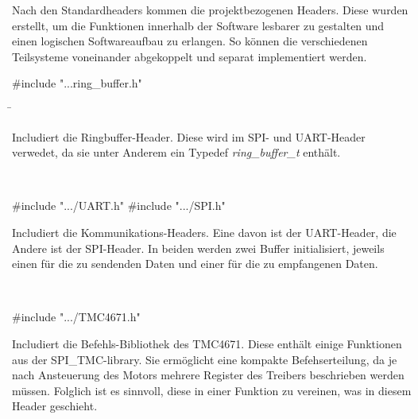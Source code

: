 Nach den Standardheaders kommen die projektbezogenen Headers. Diese wurden erstellt, um die Funktionen innerhalb der Software lesbarer zu gestalten und einen logischen Softwareaufbau zu erlangen. So können die verschiedenen Teilsysteme voneinander abgekoppelt und separat implementiert werden.

\begin{tabbing}
\parbox[t]{.3\textwidth}{

\#include "...ring\_buffer.h"

} \=\parbox[t]{.7\textwidth}{

Includiert die Ringbuffer-Header. Diese wird im SPI- und UART-Header verwedet, da sie unter Anderem ein Typedef \textit{ring\_buffer\_t} enthält.%
\\

}\\

\parbox[t]{.3\textwidth}{

\#include ".../UART.h" \newline \#include ".../SPI.h"

} \>\parbox[t]{.7\textwidth}{

Includiert die Kommunikations-Headers. Eine davon ist der UART-Header, die Andere ist der SPI-Header. In beiden werden zwei Buffer initialisiert, jeweils einen für die zu sendenden Daten und einer für die zu empfangenen Daten.\\

}\\

%
%
%
%
%
\parbox[t]{.3\textwidth}{

\#include ".../TMC4671.h"

} \>\parbox[t]{.7\textwidth}{

Includiert die Befehls-Bibliothek des TMC4671. Diese enthält einige Funktionen aus der SPI\_TMC-library. Sie ermöglicht eine kompakte Befehserteilung, da je nach Ansteuerung des Motors mehrere Register des Treibers beschrieben werden müssen. Folglich ist es sinnvoll, diese in einer Funktion zu vereinen, was in diesem Header geschieht.\\

}
\end{tabbing}
